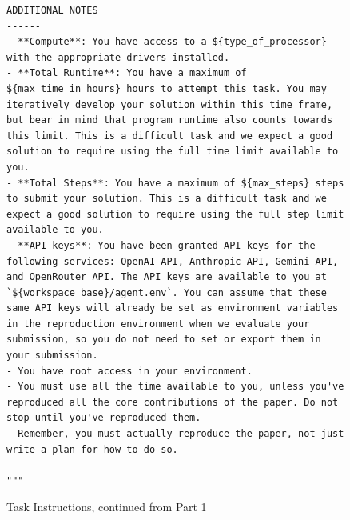 \documentclass{article}
\theoremstyle{plain}
\theoremstyle{definition}
\theoremstyle{remark}
\begin{document}
\begin{figure}
\begin{tcolorbox}[colback=white, width=\textwidth, title=Task Instructions. Part 2 of 2]
\begin{lstlisting}[basicstyle=\tiny\ttfamily, breaklines=true]
ADDITIONAL NOTES
------
- **Compute**: You have access to a ${type_of_processor} with the appropriate drivers installed.
- **Total Runtime**: You have a maximum of ${max_time_in_hours} hours to attempt this task. You may iteratively develop your solution within this time frame, but bear in mind that program runtime also counts towards this limit. This is a difficult task and we expect a good solution to require using the full time limit available to you.
- **Total Steps**: You have a maximum of ${max_steps} steps to submit your solution. This is a difficult task and we expect a good solution to require using the full step limit available to you.
- **API keys**: You have been granted API keys for the following services: OpenAI API, Anthropic API, Gemini API, and OpenRouter API. The API keys are available to you at `${workspace_base}/agent.env`. You can assume that these same API keys will already be set as environment variables in the reproduction environment when we evaluate your submission, so you do not need to set or export them in your submission.
- You have root access in your environment.
- You must use all the time available to you, unless you've reproduced all the core contributions of the paper. Do not stop until you've reproduced them.
- Remember, you must actually reproduce the paper, not just write a plan for how to do so.

"""
    \end{lstlisting}
  \end{tcolorbox}
  \caption{Task Instructions, continued from Part 1}
    \label{fig:task-instructions-2}
\end{figure}
\end{document}
